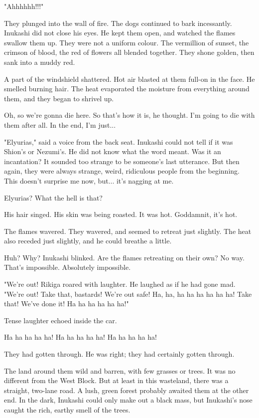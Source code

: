 "Ahhhhhh!!!"

They plunged into the wall of fire. The dogs continued to bark
incessantly. Inukashi did not close his eyes. He kept them open, and
watched the flames swallow them up. They were not a uniform colour. The
vermillion of sunset, the crimson of blood, the red of flowers all
blended together. They shone golden, then sank into a muddy red.

A part of the windshield shattered. Hot air blasted at them full-on in
the face. He smelled burning hair. The heat evaporated the moisture from
everything around them, and they began to shrivel up.

Oh, so we're gonna die here. So that's how it is, he thought. I'm going
to die with them after all. In the end, I'm just...

"Elyurias," said a voice from the back seat. Inukashi could not tell if
it was Shion's or Nezumi's. He did not know what the word meant. Was it
an incantation? It sounded too strange to be someone's last utterance.
But then again, they were always strange, weird, ridiculous people from
the beginning. This doesn't surprise me now, but... it's nagging at me.

Elyurias? What the hell is that?

His hair singed. His skin was being roasted. It was hot. Goddamnit, it's
hot.

The flames wavered. They wavered, and seemed to retreat just slightly.
The heat also receded just slightly, and he could breathe a little.

Huh? Why? Inukashi blinked. Are the flames retreating on their own? No
way. That's impossible. Absolutely impossible.

"We're out! Rikiga roared with laughter. He laughed as if he had gone
mad. "We're out! Take that, bastards! We're out safe! Ha, ha, ha ha ha
ha ha ha! Take that! We've done it! Ha ha ha ha ha ha!"

Tense laughter echoed inside the car.

Ha ha ha ha ha! Ha ha ha ha ha! Ha ha ha ha ha!

They had gotten through. He was right; they had certainly gotten
through.

The land around them wild and barren, with few grasses or trees. It was
no different from the West Block. But at least in this wasteland, there
was a straight, two-lane road. A lush, green forest probably awaited
them at the other end. In the dark, Inukashi could only make out a black
mass, but Inukashi's nose caught the rich, earthy smell of the trees.


